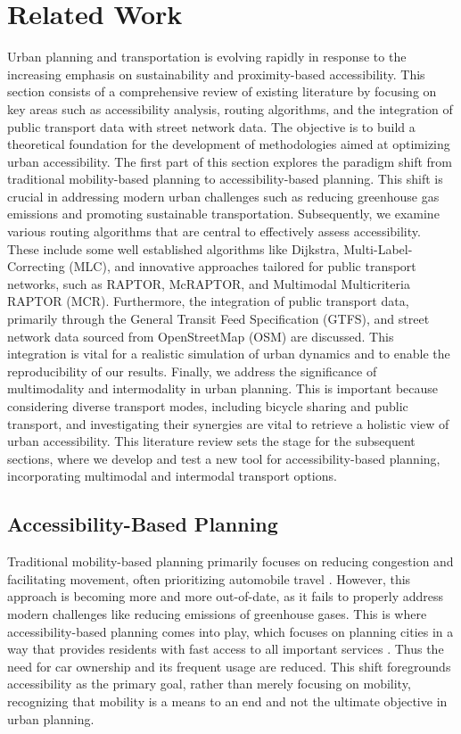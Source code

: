 \clearpage
\section{Related Work}
\label{sec:related_work}

Urban planning and transportation is evolving rapidly in response to the increasing emphasis on sustainability and proximity-based accessibility. 
This section consists of a comprehensive review of existing literature by focusing on key areas such as accessibility analysis, routing algorithms, and the integration of public transport data with street network data. 
The objective is to build a theoretical foundation for the development of methodologies aimed at optimizing urban accessibility. 
The first part of this section explores the paradigm shift from traditional mobility-based planning to accessibility-based planning.
This shift is crucial in addressing modern urban challenges such as reducing greenhouse gas emissions and promoting sustainable transportation. 
Subsequently, we examine various routing algorithms that are central to effectively assess accessibility. 
These include some well established algorithms like Dijkstra, Multi-Label-Correcting (MLC), and innovative approaches tailored for public transport networks, such as RAPTOR, McRAPTOR, and Multimodal Multicriteria RAPTOR (MCR). 
Furthermore, the integration of public transport data, primarily through the General Transit Feed Specification (GTFS), and street network data sourced from OpenStreetMap (OSM) are discussed. 
This integration is vital for a realistic simulation of urban dynamics and to enable the reproducibility of our results. 
Finally, we address the significance of multimodality and intermodality in urban planning.
This is important because considering diverse transport modes, including bicycle sharing and public transport, and investigating their synergies are vital to retrieve a holistic view of urban accessibility.
This literature review sets the stage for the subsequent sections, where we develop and test a new tool for accessibility-based planning, incorporating multimodal and intermodal transport options.

\subsection{Accessibility-Based Planning}
\label{subsec:accessibility_based_planning}

Traditional mobility-based planning primarily focuses on reducing congestion and facilitating movement, often prioritizing automobile travel .
However, this approach is becoming more and more out-of-date, as it fails to properly address modern challenges like reducing emissions of greenhouse gases.
This is where accessibility-based planning comes into play, which focuses on planning cities in a way that provides residents with fast access to all important services .
Thus the need for car ownership and its frequent usage are reduced.
This shift foregrounds accessibility as the primary goal, rather than merely focusing on mobility, recognizing that mobility is a means to an end and not the ultimate objective in urban planning. 

